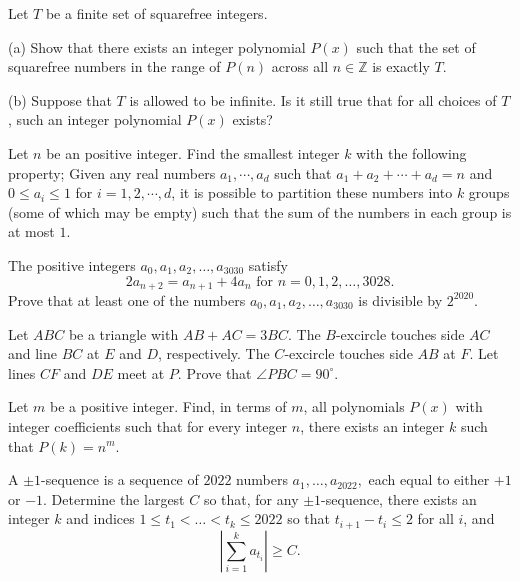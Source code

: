 \documentclass[11pt]{scrartcl}
\begin{document}
\begin{problem}[2100441935415071480]
Let $T$ be a finite set of squarefree integers.

(a) Show that there exists an integer polynomial $P(x)$ such that the set of squarefree numbers in the range of $P(n)$ across all $n \in \mathbb{Z}$ is exactly $T$.

(b) Suppose that $T$ is allowed to be infinite. Is it still true that for all choices of $T$, such an integer polynomial $P(x)$ exists?
\end{problem}
\begin{problem}[1154252954200953594]
Let $n$ be an positive integer. Find the smallest integer $k$ with the following property; Given any real numbers $a_1 , \cdots , a_d $ such that $a_1 + a_2 + \cdots + a_d = n$ and $0 \le a_i \le 1$ for $i=1,2,\cdots ,d$, it is possible to partition these numbers into $k$ groups (some of which may be empty) such that the sum of the numbers in each group is at most $1$.
\end{problem}
\begin{problem}[583277702191991]
	The positive integers $a_0, a_1, a_2, \ldots, a_{3030}$ satisfy$$2a_{n + 2} = a_{n + 1} + 4a_n \text{ for } n = 0, 1, 2, \ldots, 3028.$$
Prove that at least one of the numbers $a_0, a_1, a_2, \ldots, a_{3030}$ is divisible by $2^{2020}$.
\end{problem}
\begin{problem}[760426813975831]
Let $ABC$ be a triangle with $AB+AC=3BC$. The $B$-excircle touches side $AC$ and line $BC$ at $E$ and $D$, respectively. The $C$-excircle touches side $AB$ at $F$. Let lines $CF$ and $DE$ meet at $P$. Prove that $\angle PBC = 90^{\circ}$.
\end{problem}
\begin{problem}[3838873685857064127]
Let \(m\) be a positive integer. Find, in terms of \(m\), all polynomials \(P(x)\) with integer coefficients such that for every integer \(n\), there exists an integer \(k\) such that \(P(k)=n^m\).
\end{problem}
\begin{problem}[7948249970111159954]
	A $\pm 1$-sequence is a sequence of $2022$ numbers $a_1, \ldots, a_{2022},$ each equal to either $+1$ or $-1$. Determine the largest $C$ so that, for any $\pm 1$-sequence, there exists an integer $k$ and indices $1 \le t_1 < \ldots < t_k \le 2022$ so that $t_{i+1} - t_i \le 2$ for all $i$, and$$\left| \sum_{i = 1}^{k} a_{t_i} \right| \ge C.$$
\end{problem}
\end{document}
